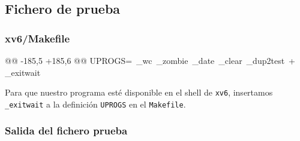 \subsection{Fichero de prueba}
\subsubsection{xv6/Makefile}
\begin{listing}
@@ -185,5 +185,6 @@ UPROGS=\
    _wc\
    _zombie\
    _date\
    _clear\
    _dup2test\
+   _exitwait\
\end{listing}
\par Para que nuestro programa esté disponible en el shell de \texttt{xv6}, insertamos 
\texttt{\_exitwait} a la definición \texttt{UPROGS} en el \texttt{Makefile}.

\subsubsection{Salida del fichero prueba}
